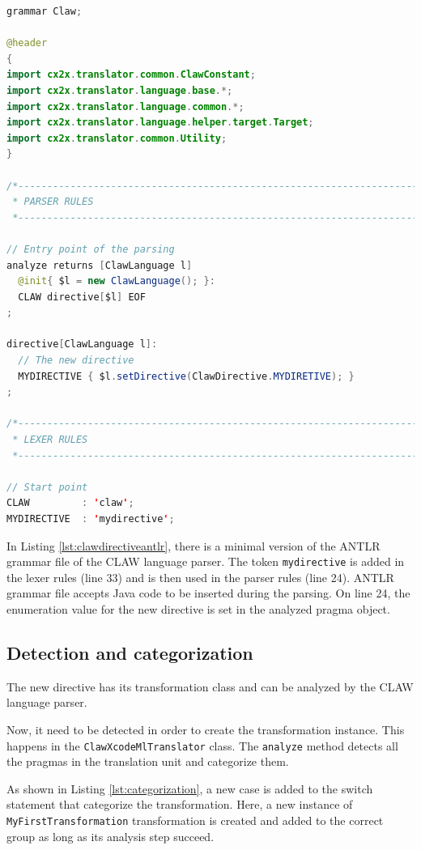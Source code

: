 \documentclass[a4paper, 11pt]{report}
\begin{document}
\begin{lstlisting}[label=lst:clawdirectiveantlr, caption=Claw.g4, language=java]
grammar Claw;

@header
{
import cx2x.translator.common.ClawConstant;
import cx2x.translator.language.base.*;
import cx2x.translator.language.common.*;
import cx2x.translator.language.helper.target.Target;
import cx2x.translator.common.Utility;
}

/*----------------------------------------------------------------------------
 * PARSER RULES
 *----------------------------------------------------------------------------*/

// Entry point of the parsing
analyze returns [ClawLanguage l]
  @init{ $l = new ClawLanguage(); }:
  CLAW directive[$l] EOF
;

directive[ClawLanguage l]:
  // The new directive
  MYDIRECTIVE { $l.setDirective(ClawDirective.MYDIRETIVE); }
;

/*----------------------------------------------------------------------------
 * LEXER RULES
 *----------------------------------------------------------------------------*/

// Start point
CLAW         : 'claw';
MYDIRECTIVE  : 'mydirective';
\end{lstlisting}

In Listing \ref{lst:clawdirectiveantlr}, there is a minimal version of the
ANTLR grammar file of the CLAW language parser. The token
\lstinline|mydirective| is added in the lexer rules (line 33) and is then
used in the parser rules (line 24). ANTLR grammar file accepts Java code
to be inserted during the parsing. On line 24, the enumeration value for
the new directive is set in the analyzed pragma object.

\subsection{Detection and categorization}
The new directive has its transformation class and can be analyzed by the
CLAW language parser.

Now, it need to be detected in order to create the transformation instance.
This happens in the \lstinline|ClawXcodeMlTranslator| class. The
\lstinline|analyze| method detects all the pragmas in the translation unit
and categorize them.

As shown in Listing \ref{lst:categorization}, a new case is added to the switch
statement that categorize the transformation. Here, a new instance of
\lstinline|MyFirstTransformation| transformation is created and added to the
correct group as long as its analysis step succeed.
\end{document}
